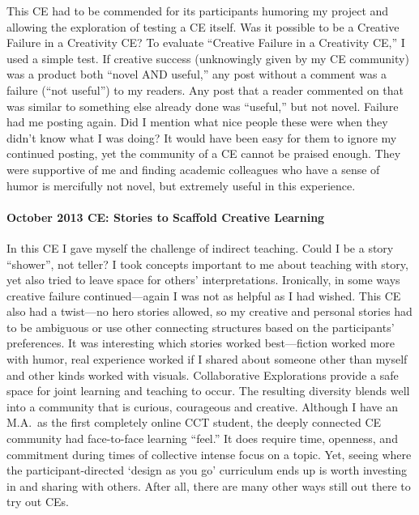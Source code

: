 This CE had to be commended for its participants humoring my project and
allowing the exploration of testing a CE itself. Was it possible to be a
Creative Failure in a Creativity CE? To evaluate ``Creative Failure in a
Creativity CE,'' I used a simple test. If creative success (unknowingly
given by my CE community) was a product both ``novel AND useful,'' any
post without a comment was a failure (``not useful'') to my readers. Any
post that a reader commented on that was similar to something else
already done was ``useful,'' but not novel. Failure had me posting
again. Did I mention what nice people these were when they didn't know
what I was doing? It would have been easy for them to ignore my
continued posting, yet the community of a CE cannot be praised enough.
They were supportive of me and finding academic colleagues who have a
sense of humor is mercifully not novel, but extremely useful in this
experience.

\paragraph{October 2013 CE: Stories to Scaffold Creative
Learning}\label{october-2013-ce-stories-to-scaffold-creative-learning}

In this CE I gave myself the challenge of indirect teaching. Could I be
a story ``shower'', not teller? I took concepts important to me about
teaching with story, yet also tried to leave space for others'
interpretations. Ironically, in some ways creative failure
continued---again I was not as helpful as I had wished. This CE also had
a twist---no hero stories allowed, so my creative and personal stories
had to be ambiguous or use other connecting structures based on the
participants' preferences. It was interesting which stories worked
best---fiction worked more with humor, real experience worked if I
shared about someone other than myself and other kinds worked with
visuals. Collaborative Explorations provide a safe space for joint
learning and teaching to occur. The resulting diversity blends well into
a community that is curious, courageous and creative. Although I have an
M.A.~as the first completely online CCT student, the deeply connected CE
community had face-to-face learning ``feel.'' It does require time,
openness, and commitment during times of collective intense focus on a
topic. Yet, seeing where the participant-directed `design as you go'
curriculum ends up is worth investing in and sharing with others. After
all, there are many other ways still out there to try out CEs.

